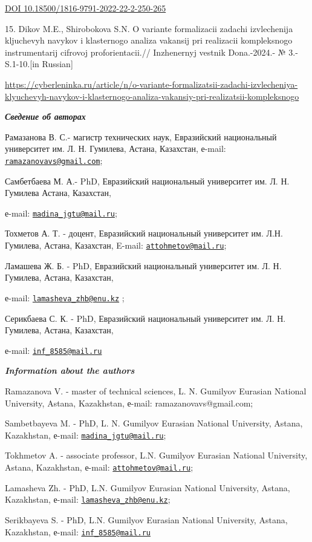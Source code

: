 \href{https://doi.org/10.18500/1816-9791-2022-22-2-250-265}{DOI
10.18500/1816-9791-2022-22-2-250-265}

15. Dikov M.E., Shirobokova S.N. O variante formalizacii zadachi
izvlechenija kljuchevyh navykov i klasternogo analiza vakansij pri
realizacii kompleksnogo instrumentarij cifrovoj proforientacii.//
Inzhenernyj vestnik Dona.-2024.- № 3.- S.1-10.{[}in Russian{]}

\url{https://cyberleninka.ru/article/n/o-variante-formalizatsii-zadachi-izvlecheniya-klyuchevyh-navykov-i-klasternogo-analiza-vakansiy-pri-realizatsii-kompleksnogo}

\emph{{\bfseries Сведение об авторах}}

Рамазанова В. С.- магистр технических наук, Евразийский национальный
университет им. Л. Н. Гумилева, Астана, Казахстан, е-mail:
\href{mailto:ramazanovavs@gmail.com}{\nolinkurl{ramazanovavs@gmail.com}};

Самбетбаева М. А.- PhD, Евразийский национальный университет им. Л. Н.
Гумилева Астана, Казахстан,

е-mail:
\href{mailto:madina_jgtu@mail.ru}{\nolinkurl{madina\_jgtu@mail.ru}};

Тохметов А. Т. - доцент, Евразийский национальный университет им. Л.Н.
Гумилева, Астана, Казахстан, E-mail:
\href{mailto:attohmetov@mail.ru}{\nolinkurl{attohmetov@mail.ru}};

Ламашева Ж. Б. - PhD, Евразийский национальный университет им. Л. Н.
Гумилева, Астана, Казахстан,

е-mail:
\href{mailto:lamasheva_zhb@enu.kz}{\nolinkurl{lamasheva\_zhb@enu.kz}} ;

Серикбаева С. К. - PhD, Евразийский национальный университет им. Л. Н.
Гумилева, Астана, Казахстан,

е-mail: \href{mailto:inf_8585@mail.ru}{\nolinkurl{inf\_8585@mail.ru}}

\emph{{\bfseries Information about the authors}}

Ramazanova V. - master of technical sciences, L. N. Gumilyov Eurasian
National University, Astana, Kazakhstan, е-mail: ramazanovavs@gmail.com;

Sambetbayeva M. - PhD, L. N. Gumilyov Eurasian National University,
Astana, Kazakhstan, е-mail:
\href{mailto:madina_jgtu@mail.ru}{\nolinkurl{madina\_jgtu@mail.ru}};

Tokhmetov A. - associate professor, L.N. Gumilyov Eurasian National
University, Astana, Kazakhstan, е-mail:
\href{mailto:attohmetov@mail.ru}{\nolinkurl{attohmetov@mail.ru}};

Lamasheva Zh. - PhD, L.N. Gumilyov Eurasian National University, Astana,
Kazakhstan, е-mail:
\href{mailto:lamasheva_zhb@enu.kz}{\nolinkurl{lamasheva\_zhb@enu.kz}};

Serikbayeva S. - PhD, L.N. Gumilyov Eurasian National University,
Astana, Kazakhstan, е-mail:
\href{mailto:inf_8585@mail.ru}{\nolinkurl{inf\_8585@mail.ru}}